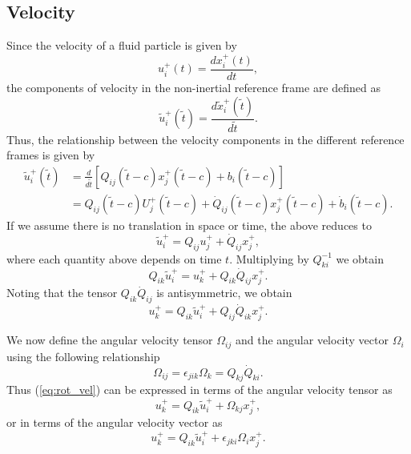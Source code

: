 \documentclass[oneside,a4paper,11pt]{report}
\begin{document}
\subsection{Velocity}
Since the velocity of a fluid particle is given by 
\begin{equation}
u^+_i(t) = \frac{d x^+_i(t)}{dt},
\end{equation}
the components of velocity in the non-inertial reference frame are defined as
\begin{equation}
\tilde{u}^+_i(\tilde{t}) = \frac{d \tilde{x}^+_i(\tilde{t})}{d \tilde{t}} .
\end{equation}
Thus, the relationship between the velocity components in the different reference frames is given by
\begin{align}
\label{eq:rot_vel_general}
\tilde{u}^+_i(\tilde{t}) &= \frac{d}{d\tilde{t}} [Q_{ij}(\tilde{t} - c) x^+_j(\tilde{t} - c) + b_i(\tilde{t} - c)] \nonumber \\
& = Q_{ij}(\tilde{t} - c) U^+_j(\tilde{t} - c) + \dot{Q}_{ij}(\tilde{t} - c) x^+_j(\tilde{t} - c) + \dot{b}_i(\tilde{t} - c).
\end{align}
If we assume there is no translation in space or time, the above reduces to
\begin{equation}
\label{eq:rot_vel_inter}
\tilde{u}^+_i = Q_{ij} u^+_j + \dot{Q}_{ij} x^+_j, 
\end{equation}
where each quantity above depends on time $t$. Multiplying by $Q^{-1}_{ki}$ we obtain
\begin{equation}
Q_{ik} \tilde{u}^+_i = u^+_k + Q_{ik}\dot{Q}_{ij}x^+_j.
\end{equation}
Noting that the tensor $Q_{ik} \dot{Q}_{ij}$ is antisymmetric, we obtain
\begin{equation}
\label{eq:rot_vel}
u^+_k = Q_{ik} \tilde{u}^+_i + Q_{ij}\dot{Q}_{ik}x^+_j.
\end{equation}

We now define the angular velocity tensor $\Omega_{ij}$ and the angular velocity vector $\Omega_i$ using the following relationship 
\begin{equation}
\label{eq:angular_definition}
\Omega_{ij} = \epsilon_{jik}\Omega_{k} = Q_{kj}\dot{Q}_{ki}.
\end{equation}
Thus (\ref{eq:rot_vel}) can be expressed in terms of the angular velocity tensor as
\begin{equation}
\label{eq:rot_vel_angular_tensor}
u^+_k = Q_{ik} \tilde{u}^+_i + \Omega_{kj}x^+_j,
\end{equation}
or in terms of the angular velocity vector as
\begin{equation}
\label{rot_vel_angular_vector}
u^+_k = Q_{ik} \tilde{u}^+_i + \epsilon_{jki}\Omega_ix^+_j.
\end{equation}
\end{document}
